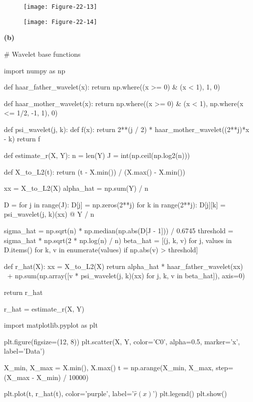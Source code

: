 \begin{figure}[H]
\texttt{[image: Figure-22-13]}
\end{figure}

\begin{figure}[H]
\texttt{[image: Figure-22-14]}
\end{figure}

\textbf{(b)}

\begin{python}
# Wavelet base functions

import numpy as np

def haar_father_wavelet(x):
    return np.where((x >= 0) & (x < 1), 1, 0)

def haar_mother_wavelet(x):
    return np.where((x >= 0) & (x < 1),  np.where(x <= 1/2, -1, 1), 0)

def psi_wavelet(j, k):
    def f(x):
        return 2**(j / 2) * haar_mother_wavelet((2**j)*x - k)
    return f
\end{python}

\begin{python}
def estimate_r(X, Y):
    n = len(Y)
    J = int(np.ceil(np.log2(n)))

    def X_to_L2(t):
        return (t - X.min()) / (X.max() - X.min())

    xx = X_to_L2(X)
    alpha_hat = np.sum(Y) / n

    D = {}
    for j in range(J):
        D[j] = np.zeros(2**j)
        for k in range(2**j):
            D[j][k] = psi_wavelet(j, k)(xx) @ Y / n

    sigma_hat = np.sqrt(n) * np.median(np.abs(D[J - 1])) / 0.6745
    threshold = sigma_hat * np.sqrt(2 * np.log(n) / n)
    beta_hat = [(j, k, v) for j, values in D.items() for k, v in enumerate(values) if np.abs(v) > threshold]

    def r_hat(X):
        xx = X_to_L2(X)
        return alpha_hat * haar_father_wavelet(xx) \
            + np.sum(np.array([v * psi_wavelet(j, k)(xx) for j, k, v in beta_hat]), axis=0)
    
    return r_hat
\end{python}

\begin{python}
r_hat = estimate_r(X, Y)
\end{python}

\begin{python}
import matplotlib.pyplot as plt

plt.figure(figsize=(12, 8))
plt.scatter(X, Y, color='C0', alpha=0.5, marker='x', label='Data')

X_min, X_max = X.min(), X.max()
t = np.arange(X_min, X_max, step=(X_max - X_min) / 10000)

plt.plot(t, r_hat(t), color='purple', label='$\hat{r}(x)$')
plt.legend()
plt.show()
\end{python}

